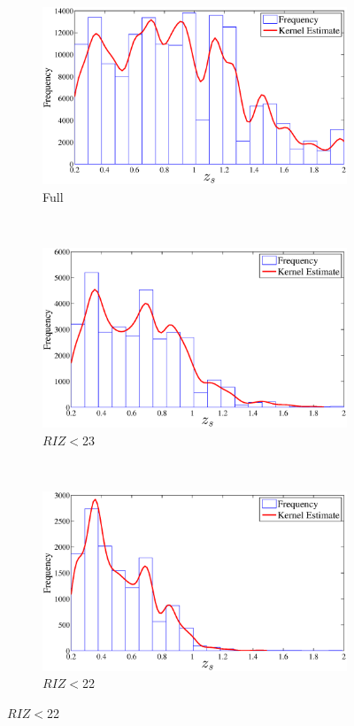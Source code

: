 \documentclass[useAMS,usenatbib,fleqn]{mn2e}
\begin{document}
\begin{figure}
        \centering
        \begin{subfigure}[b]{1\columnwidth}
                 \includegraphics[width=\textwidth]{figures/zspec.eps}
                 \caption{Full}
        \end{subfigure}
        ~
        \begin{subfigure}[b]{1\columnwidth}
                 \includegraphics[width=\textwidth]{figures/zspec_23.eps}
                 \caption{$RIZ<$23}
        \end{subfigure}
        ~
        \begin{subfigure}[b]{1\columnwidth}
                 \includegraphics[width=\textwidth]{figures/zspec_22.eps}
                 \caption{$RIZ<$22}
        \end{subfigure}
        

\end{figure}
\end{document}
